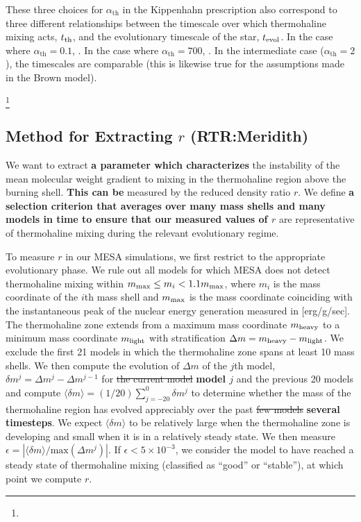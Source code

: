 These three choices for $\alpha_{\text{th}}$ in the Kippenhahn prescription also correspond to three different relationships between the timescale over which thermohaline mixing acts, $t_{\rm th}$, and the evolutionary timescale of the star, $t_{\rm{evol}}$. 
In the case where $\alpha_{\text{th}} = 0.1$, 
. In the case where $\alpha_{\text{th}} = 700$, 
. In the intermediate case ($\alpha_{\text{th}}= 2$), the timescales are comparable (this is likewise true for the assumptions made in the Brown model).

\footnote{}

\subsection{Method for Extracting $r$ \textbf{(RTR:Meridith)}}
%
We want to extract \textbf{a parameter which characterizes} the instability of the mean molecular weight gradient to mixing in the thermohaline region above the burning shell. \textbf{This can be} measured by the reduced density ratio $r$.
We define \textbf{a selection criterion that averages over many mass shells and many models in time to ensure that our measured values of $r$} are representative of thermohaline mixing during the relevant evolutionary regime.

To measure $r$ in our MESA simulations, we first restrict to the appropriate evolutionary phase.
We rule out all models for which MESA does not detect thermohaline mixing within $m_{\rm max} \leq m_i < 1.1 m_{\rm max}$, where $m_i$ is the mass coordinate of the $i$th mass shell and $m_{\rm max}$ is the mass coordinate coinciding with the instantaneous peak of the nuclear energy generation measured in [erg/g/sec].
The thermohaline zone extends from a maximum mass coordinate $m_{\rm heavy}$ to a minimum mass coordinate $m_{\rm light}$ with stratification $\Delta m = m_{\rm heavy} - m_{\rm light}$.
We exclude the first 21 models in which the thermohaline zone spans at least 10 mass shells.
We then compute the evolution of $\Delta m$ of the $j$th model, $\delta m^j = \Delta m^{j} - \Delta m^{j-1}$ for \sout{the current model} \textbf{model $j$} and the previous 20 models and compute $\langle \delta m \rangle = (1/20)\sum_{j=-20}^0 \delta m^j$ to determine whether the mass of the thermohaline region has evolved appreciably over the past \sout{few models} \textbf{several timesteps}. We expect $\langle \delta m \rangle$ to be relatively large when the thermohaline zone is developing and small when it is in a relatively steady state.
We then measure $\epsilon = |\langle \delta m \rangle / \mathrm{max}(\Delta m^j)|$. If $\epsilon < 5 \times 10^{-3}$, we consider the model to have reached a steady state of thermohaline mixing (classified as ``good'' or ``stable''), at which point we compute $r$.

